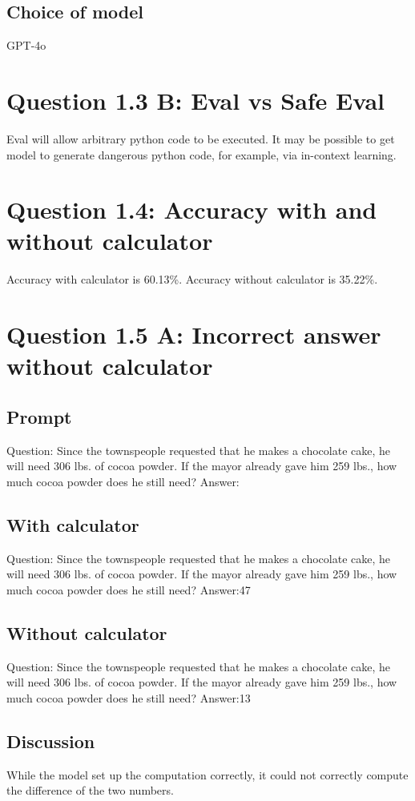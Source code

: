 \documentclass[11pt]{article}
\begin{document}
\subsection{Choice of model}
\label{sec:orgc235704}
GPT-4o

\section{Question 1.3 B: Eval vs Safe Eval}
\label{sec:org430e850}
Eval will allow arbitrary python code to be executed. It may be possible to get model to generate dangerous python code, for example, via in-context learning.
\section{Question 1.4: Accuracy with and without calculator}
\label{sec:org0ec497c}
Accuracy with calculator is 60.13\%. Accuracy without calculator is 35.22\%.

\section{Question 1.5 A: Incorrect answer without calculator}
\label{sec:org17892b7}
\subsection{Prompt}
\label{sec:org7e24f91}
Question: Since the townspeople requested that he makes a chocolate cake, he will need 306 lbs. of cocoa powder.
If the mayor already gave him 259 lbs., how much cocoa powder does he still need?
Answer:
\subsection{With calculator}
\label{sec:orgb46ab4c}
Question: Since the townspeople requested that he makes a chocolate cake, he will need 306 lbs. of cocoa powder.
If the mayor already gave him 259 lbs., how much cocoa powder does he still need?
Answer:\label{org9620837}47
\subsection{Without calculator}
\label{sec:org33d5440}
Question: Since the townspeople requested that he makes a chocolate cake, he will need 306 lbs. of cocoa powder.
If the mayor already gave him 259 lbs., how much cocoa powder does he still need?
Answer:\label{org74db53a}13
\subsection{Discussion}
\label{sec:org0a07f88}
While the model set up the computation correctly, it could not correctly compute the difference of the two numbers.
\end{document}
